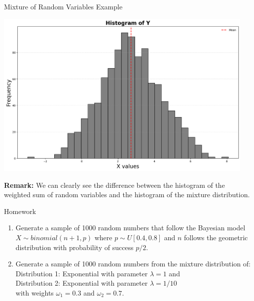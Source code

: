 \documentclass[8pt]{beamer}
\begin{document}
\begin{frame}[fragile]{Mixture of Random Variables Example}
\begin{center}
\includegraphics[width=0.95\textwidth]{chapter2-part1-plot5.png}
\end{center}

\vspace{-3mm}

{\bf Remark:} We can clearly see the difference between the histogram of the weighted sum of random variables and the histogram of the mixture distribution.
\end{frame}

\begin{frame}{Homework}
\begin{enumerate}
	\item Generate a sample of 1000 random numbers that follow the Bayesian model $X \sim binomial(n+1,p)$ where $p \sim U[0.4, 0.8]$ and $n$ follows the geometric distribution with probability of success $p/2$.
	\item Generate a sample of 1000 random numbers from the mixture distribution of:\\
Distribution 1: Exponential with parameter $\lambda=1$ and \\
Distribution 2: Exponential with parameter $\lambda=1/10$  \\
with weights $\omega_1=0.3$ and $\omega_2=0.7$. \\
\end{enumerate}
\end{frame}
\end{document}
